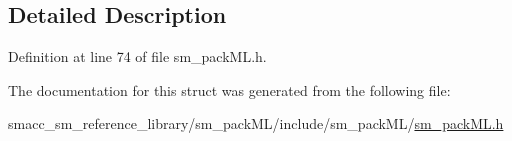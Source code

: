 \subsection{Detailed Description}


Definition at line 74 of file sm\+\_\+pack\+M\+L.\+h.



The documentation for this struct was generated from the following file\+:\begin{DoxyCompactItemize}
\item 
smacc\+\_\+sm\+\_\+reference\+\_\+library/sm\+\_\+pack\+M\+L/include/sm\+\_\+pack\+M\+L/\hyperlink{sm__packML_8h}{sm\+\_\+pack\+M\+L.\+h}\end{DoxyCompactItemize}
